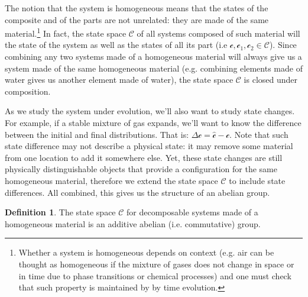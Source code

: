 \documentclass[aps,pra,10pt,twocolumn,floatfix,nofootinbib]{revtex4-1}
\theoremstyle{definition}
\newtheorem{defn}[prop]{Definition}
\begin{document}
The notion that the system is homogeneous means that the states of the composite and of the parts are not unrelated: they are made of the same material.\footnote{Whether a system is homogeneous depends on context (e.g. air can be thought as homogeneous if the mixture of gases does not change in space or in time due to phase transitions or chemical processes) and one must check that such property is maintained by by time evolution.} In fact, the state space $\mathcal{C}$ of all systems composed of such material will the state of the system as well as the states of all its part (i.e $\mathcal{c}, \mathcal{c}_1, \mathcal{c}_2 \in \mathcal{C}$). Since combining any two systems made of a homogeneous material will always give us a system made of the same homogeneous material (e.g. combining elements made of water gives us another element made of water), the state space $\mathcal{C}$ is closed under composition.

As we study the system under evolution, we'll also want to study state changes. For example, if a stable mixture of gas expands, we'll want to know the difference between the initial and final distributions. That is: $\Delta\mathcal{c}=\hat{\mathcal{c}}-\mathcal{c}$. Note that such state difference may not describe a physical state: it may remove some material from one location to add it somewhere else. Yet, these state changes are still physically distinguishable objects that provide a configuration for the same homogeneous material, therefore we extend the state space $\mathcal{C}$ to include state differences. All combined, this gives us the structure of an abelian group.

\begin{defn}\label{reducible_state_space}
The state space $\mathcal{C}$ for decomposable systems made of a homogeneous material is an additive abelian (i.e. commutative) group.
\end{defn}
\end{document}
